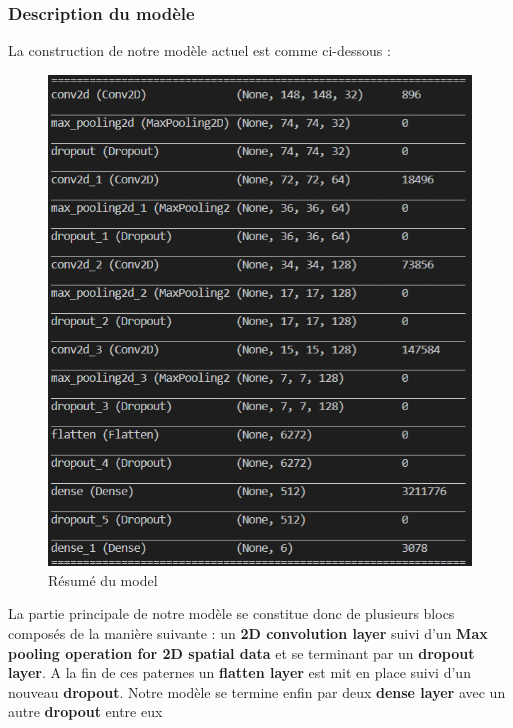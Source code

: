 \documentclass[12pt ,a4paper ]{article}
\begin{document}
\begin{multicols}{2}
\subsubsection{Description du modèle}
La construction de notre modèle actuel est comme ci-dessous : 

\begin{figure}[H]
    \begin{center}
        \includegraphics[scale=0.62]{./img/model_sum.png}
    \end{center}
\caption{\small{Résumé du model}}
\end{figure}

La partie principale de notre modèle se constitue donc de plusieurs blocs composés de la manière suivante : un \textbf{2D convolution layer}  suivi d'un \textbf{Max pooling operation for 2D spatial data} et se terminant par un \textbf{dropout layer}. A la fin de ces paternes un \textbf{flatten layer} est mit en place suivi d'un nouveau \textbf{dropout}. Notre modèle se termine enfin par deux \textbf{dense layer} avec un autre \textbf{dropout} entre eux \\ 


\end{multicols}
\end{document}
